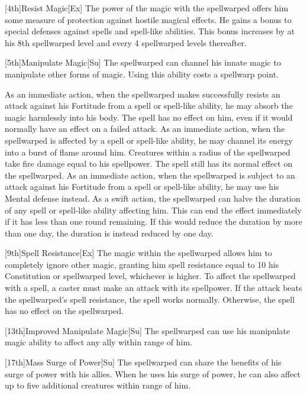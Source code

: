 [4th]{Resist Magic}[Ex]
The power of the magic with the spellwarped offers him some measure of protection against hostile magical effects.
He gains a  bonus to special defenses against spells and spell-like abilities.
This bonus increases by  at his 8th spellwarped level and every 4 spellwarped levels thereafter.

[5th]{Manipulate Magic}[Su]
The spellwarped can channel his innate magic to manipulate other forms of magic.
Using this ability costs a spellwarp point.

As an immediate action, when the spellwarped makes successfully resists an attack against his Fortitude from a spell or spell-like ability, he may absorb the magic harmlessly into his body.
The spell has no effect on him, even if it would normally have an effect on a failed attack.
As an immediate action, when the spellwarped is affected by a spell or spell-like ability, he may channel its energy into a burst of flame around him.
Creatures within a \areasmall radius of the spellwarped take fire damage equal to his spellpower.
The spell still has its normal effect on the spellwarped.
As an immediate action, when the spellwarped is subject to an attack against his Fortitude from a spell or spell-like ability, he may use his Mental defense instead.
As a swift action, the spellwarped can halve the duration of any spell or spell-like ability affecting him.
This can end the effect immediately if it has less than one round remaining.
If this would reduce the duration by more than one day, the duration is instead reduced by one day.

[9th]{Spell Resistance}[Ex]
The magic within the spellwarped allows him to completely ignore other magic, granting him spell resistance equal to 10 \add his Constitution or spellwarped level, whichever is higher.
To affect the spellwarped with a spell, a caster must make an attack with its spellpower.
If the attack beats the spellwarped's spell resistance, the spell works normally.
Otherwise, the spell has no effect on the spellwarped.

[13th]{Improved Manipulate Magic}[Su]
The spellwarped can use his manipulate magic ability to affect any ally within \rngmed range of him.

[17th]{Mass Surge of Power}[Su]
The spellwarped can share the benefits of his surge of power with his allies.
When he uses his surge of power, he can also affect up to five additional creatures within \rngmed range of him.

